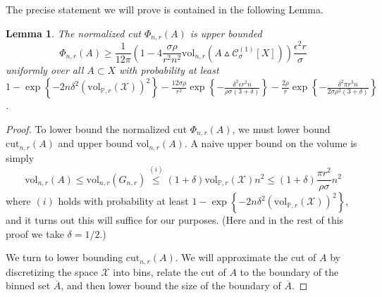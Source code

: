 \documentclass[11pt,twoside]{article}
\newtheorem{lemma}{Lemma}
\newcommand{\set}[1]{\left\{#1\right\}}
\newcommand{\vol}{\mathrm{vol}}
\newcommand{\cut}{\mathrm{cut}}
\newcommand{\1}{\mathbf{1}}
\newcommand{\Xbf}{X}             %
\newcommand{\Pbb}{\mathbb{P}}
\begin{document}
The precise statement we will prove is contained in the following Lemma.
\begin{lemma}
	\label{lem:normalized_cut_lb}
	The normalized cut $\Phi_{n,r}(A)$ is upper bounded
	\begin{equation*}
	\Phi_{n,r}(A) \geq \frac{1}{12\pi} \left(1 - 4\frac{\sigma \rho}{r^2 n^2} \vol_{n,r}(A \vartriangle \mathcal{C}_{\sigma}^{(1)}[\Xbf]) \right) \frac{\epsilon^2 r}{\sigma}
	\end{equation*}
	uniformly over all $A \subset X$ with probability at least $1 - \exp\set{-2n\delta^2(\vol_{\Pbb,r}(\mathcal{X}))^2} - \frac{12\sigma \rho}{r^2} \exp\set{-\frac{\delta^2\epsilon r^2 n}{\rho \sigma(3 + \delta)}} - \frac{2\rho}{r}\exp\set{-\frac{\delta^2\pi r^3n}{2\sigma\rho^2(3 + \delta)}}$.
\end{lemma}
\begin{proof}
	To lower bound the normalized cut $\Phi_{n,r}(A)$, we must lower bound $\cut_{n,r}(A)$ and upper bound $\vol_{n,r}(A)$. A naive upper bound on the volume is simply 
	\begin{equation}
	\label{eqn:normalized_cut_lb_pf4}
	\vol_{n,r}(A) \leq \vol_{n,r}(G_{n,r}) \overset{(i)}{\leq} (1 + \delta)  \vol_{\Pbb,r}(\mathcal{X}) n^2 \leq (1 + \delta)\frac{\pi r^2}{\rho \sigma} n^2
 	\end{equation}
	where $(i)$ holds with probability at least $1 - \exp\set{-2n\delta^2(\vol_{\Pbb,r}(\mathcal{X}))^2}$, and it turns out this will suffice for our purposes. (Here and in the rest of this proof we take $\delta = 1/2$.)
	
	We turn to lower bounding $\cut_{n,r}(A)$. We will approximate the cut of $A$ by discretizing the space $\mathcal{X}$ into bins, relate the cut of $A$ to the boundary of the binned set $\overline{A}$, and then lower bound the size of the boundary of $\overline{A}$.
	

\end{proof}
\end{document}
